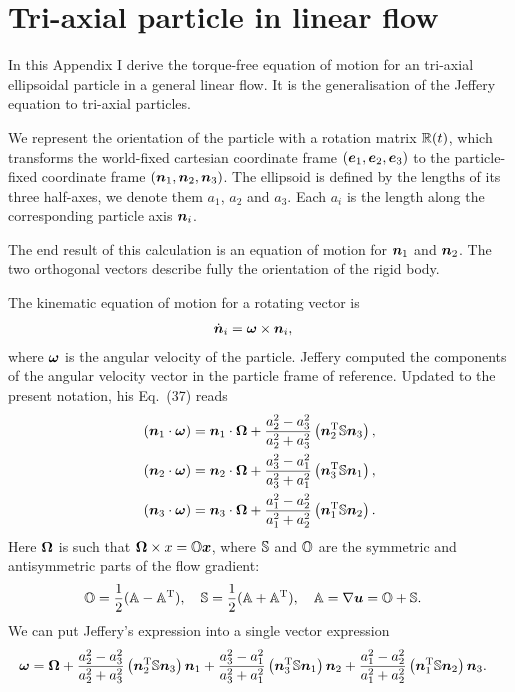 \documentclass[thesis.tex]{subfiles}
\begin{document}
\chapter{Tri-axial particle in linear flow}

In this Appendix I derive the torque-free equation of motion for an tri-axial ellipsoidal particle in a general linear flow. It is the generalisation of the Jeffery equation to tri-axial particles. 

We represent the orientation of the particle with a rotation matrix $\mathbb{R}(t)$, which transforms the world-fixed cartesian coordinate frame $(\mbox{\boldmath$e$}_1, \mbox{\boldmath$e$}_2, \mbox{\boldmath$e$}_3)$ to the particle-fixed coordinate frame $(\mbox{\boldmath$n$}_1, \mbox{\boldmath$n$}_2, \mbox{\boldmath$n$}_3)$. The ellipsoid is defined by the lengths of its three half-axes, we denote them $a_1$, $a_2$ and $a_3$. Each $a_i$ is the length along the corresponding particle axis $\mbox{\boldmath$n$}_i$.

The end result of this calculation is an equation of motion for $\mbox{\boldmath$n$}_1$ and $\mbox{\boldmath$n$}_2$. The two orthogonal vectors describe fully the orientation of the rigid body.

The kinematic equation of motion for a rotating vector is 
\begin{align}
	\dot{\ve n}_i &= \ve \omega \cross \ve n_i,\eqnlab{tri01}
\end{align}
where $\mbox{\boldmath$\omega$}$ is the angular velocity of the particle.
Jeffery \cite{jeffery1922} computed the components of the angular velocity vector in the particle frame of reference. Updated to the present notation, his Eq.~(37) reads
\begin{align*}
	(\mbox{\boldmath$n$}_1 \cdot \mbox{\boldmath$\omega$}) &= \mbox{\boldmath$n$}_1\cdot \mbox{\boldmath$\Omega$} + \frac{a_2^2-a_3^2}{a_2^2+a_3^2}\left(\mbox{\boldmath$n$}_2^{\mathrm T} \mathbb{S}\mbox{\boldmath$n$}_3\right),\\
	(\mbox{\boldmath$n$}_2 \cdot \mbox{\boldmath$\omega$}) &= \mbox{\boldmath$n$}_2\cdot \mbox{\boldmath$\Omega$} + \frac{a_3^2-a_1^2}{a_3^2+a_1^2}\left(\mbox{\boldmath$n$}_3^{\mathrm T} \mathbb{S}\mbox{\boldmath$n$}_1\right),\\
	(\mbox{\boldmath$n$}_3 \cdot \mbox{\boldmath$\omega$}) &= \mbox{\boldmath$n$}_3\cdot \mbox{\boldmath$\Omega$} + \frac{a_1^2-a_2^2}{a_1^2+a_2^2}\left(\mbox{\boldmath$n$}_1^{\mathrm T} \mathbb{S}\mbox{\boldmath$n$}_2\right).
\end{align*}
Here $\mbox{\boldmath$\Omega$}$ is such that $\mbox{\boldmath$\Omega$} \times x = \mathbb{O}\mbox{\boldmath$x$}$, where $\mathbb{S}$ and $\mathbb{O}$ are the symmetric and antisymmetric parts of the flow gradient:
\begin{align*}
	&\mathbb{O} = \frac{1}{2}(\mathbb{A} - \mathbb{A}^{\mathrm T}),\quad
	\mathbb{S} = \frac{1}{2}(\mathbb{A} + \mathbb{A}^{\mathrm T}),\quad
	\mathbb{A} = \nabla \mbox{\boldmath$u$} = \mathbb{O} + \mathbb{S}.
\end{align*}
We can put Jeffery's expression into a single vector expression
\begin{align*}
	\mbox{\boldmath$\omega$} &= \mbox{\boldmath$\Omega$}
	 + \frac{a_2^2-a_3^2}{a_2^2+a_3^2}\left(\mbox{\boldmath$n$}_2^{\mathrm T} \mathbb{S}\mbox{\boldmath$n$}_3\right)\mbox{\boldmath$n$}_1
	 + \frac{a_3^2-a_1^2}{a_3^2+a_1^2}\left(\mbox{\boldmath$n$}_3^{\mathrm T} \mathbb{S}\mbox{\boldmath$n$}_1\right)\mbox{\boldmath$n$}_2
	  + \frac{a_1^2-a_2^2}{a_1^2+a_2^2}\left(\mbox{\boldmath$n$}_1^{\mathrm T} \mathbb{S}\mbox{\boldmath$n$}_2\right)\mbox{\boldmath$n$}_3.
\end{align*}
\end{document}
